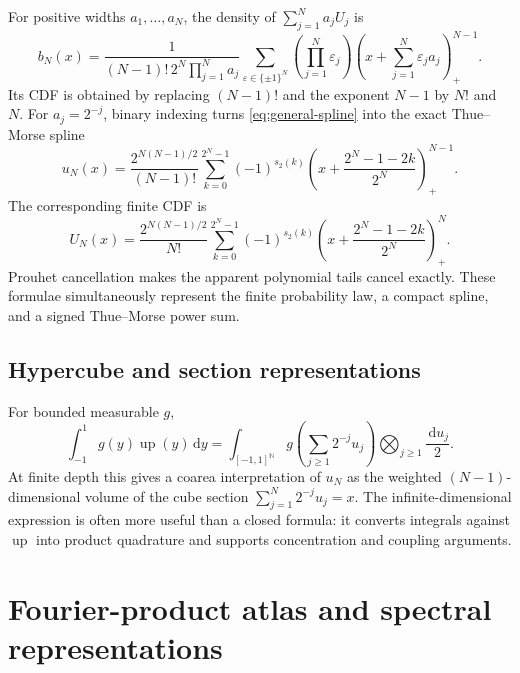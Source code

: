 \documentclass[11pt,oneside]{article}
\theoremstyle{definition}
\theoremstyle{remark}
\newcommand{\N}{\mathbb N}
\newcommand{\Up}{\operatorname{up}}
\newcommand{\dd}{\,\mathrm d}
\newcommand{\wt}{s_2}
\newcommand{\pospart}[1]{\left(#1\right)_{+}}
\begin{document}
For positive widths $a_1,\dots,a_N$, the density of
$\sum_{j=1}^Na_jU_j$ is
\begin{equation}
 b_N(x)=\frac{1}{(N-1)!\,2^N\prod_{j=1}^Na_j}
 \sum_{\varepsilon\in\{\pm1\}^N}
 \left(\prod_{j=1}^N\varepsilon_j\right)
 \pospart{x+\sum_{j=1}^N\varepsilon_ja_j}^{N-1}.        \label{eq:general-spline}
\end{equation}
Its CDF is obtained by replacing $(N-1)!$ and the exponent $N-1$ by $N!$ and $N$.
For $a_j=2^{-j}$, binary indexing turns \eqref{eq:general-spline} into the exact
Thue--Morse spline
\begin{equation}
 \boxed{\quad
 u_N(x)=\frac{2^{N(N-1)/2}}{(N-1)!}
 \sum_{k=0}^{2^N-1}(-1)^{\wt(k)}
 \pospart{x+\frac{2^N-1-2k}{2^N}}^{N-1}.
 \quad}                                                  \label{eq:TM-spline}
\end{equation}
The corresponding finite CDF is
\begin{equation}
 U_N(x)=\frac{2^{N(N-1)/2}}{N!}
 \sum_{k=0}^{2^N-1}(-1)^{\wt(k)}
 \pospart{x+\frac{2^N-1-2k}{2^N}}^{N}.                  \label{eq:TM-spline-cdf}
\end{equation}
Prouhet cancellation makes the apparent polynomial tails cancel exactly.  These formulae
simultaneously represent the finite probability law, a compact spline, and a signed
Thue--Morse power sum.

\subsection{Hypercube and section representations}

For bounded measurable $g$,
\begin{equation}
 \int_{-1}^{1}g(y)\Up(y)\dd y
 =\int_{[-1,1]^{\N}}g\left(\sum_{j\ge1}2^{-j}u_j\right)
   \bigotimes_{j\ge1}\frac{\dd u_j}{2}.                 \label{eq:infinite-cube}
\end{equation}
At finite depth this gives a coarea interpretation of $u_N$ as the weighted $(N-1)$-
dimensional volume of the cube section
\(
 \sum_{j=1}^N2^{-j}u_j=x.
\)
The infinite-dimensional expression is often more useful than a closed formula: it converts
integrals against $\Up$ into product quadrature and supports concentration and coupling
arguments.

\section{Fourier-product atlas and spectral representations}
\label{sec:fourier-atlas}
\end{document}
